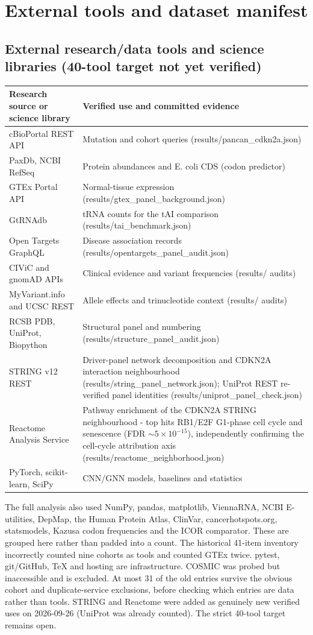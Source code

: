 \section{External tools and dataset manifest}
\subsection{External research/data tools and science libraries (40-tool target not yet verified)}
\begin{center}\small\begin{tabular}{l>{\raggedright\arraybackslash}p{8.5cm}}\hline\hline
Research source or science library & Verified use and committed evidence\\\hline
cBioPortal REST API & Mutation and cohort queries (results/pancan\_cdkn2a.json)\\
PaxDb, NCBI RefSeq & Protein abundances and E. coli CDS (codon predictor)\\
GTEx Portal API & Normal-tissue expression (results/gtex\_panel\_background.json)\\
GtRNAdb & tRNA counts for the tAI comparison (results/tai\_benchmark.json)\\
Open Targets GraphQL & Disease association records (results/opentargets\_panel\_audit.json)\\
CIViC and gnomAD APIs & Clinical evidence and variant frequencies (results/ audits)\\
MyVariant.info and UCSC REST & Allele effects and trinucleotide context (results/ audits)\\
RCSB PDB, UniProt, Biopython & Structural panel and numbering (results/structure\_panel\_audit.json)\\
STRING v12 REST & Driver-panel network decomposition and CDKN2A interaction neighbourhood (results/string\_panel\_network.json); UniProt REST re-verified panel identities (results/uniprot\_panel\_check.json)\\
Reactome Analysis Service & Pathway enrichment of the CDKN2A STRING neighbourhood - top hits RB1/E2F G1-phase cell cycle and senescence (FDR $\sim 5\times10^{-15}$), independently confirming the cell-cycle attribution axis (results/reactome\_neighborhood.json)\\
PyTorch, scikit-learn, SciPy & CNN/GNN models, baselines and statistics\\\hline\hline
\end{tabular}\end{center}
The full analysis also used NumPy, pandas, matplotlib, ViennaRNA, NCBI E-utilities, DepMap, the Human Protein Atlas, ClinVar, cancerhotspots.org, statsmodels, Kazusa codon frequencies and the ICOR comparator. These are grouped here rather than padded into a count. The historical 41-item inventory incorrectly counted nine cohorts as tools and counted GTEx twice. pytest, git/GitHub, TeX and hosting are infrastructure. COSMIC was probed but inaccessible and is excluded. At most 31 of the old entries survive the obvious cohort and duplicate-service exclusions, before checking which entries are data rather than tools. STRING and Reactome were added as genuinely new verified uses on 2026-09-26 (UniProt was already counted). The strict 40-tool target remains open.
